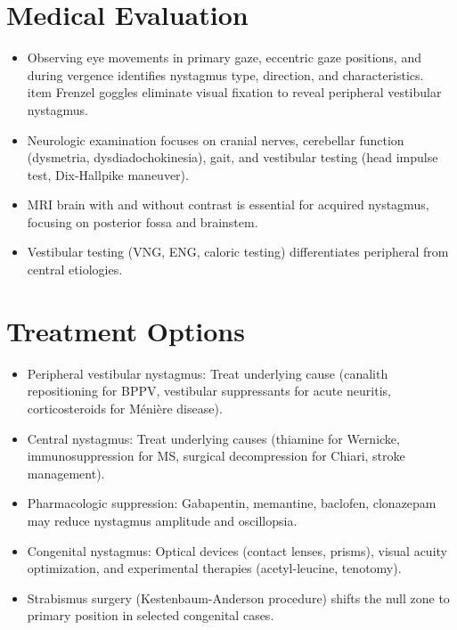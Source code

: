 \section*{Medical Evaluation}
\begin{itemize}
  \item Observing eye movements in primary gaze, eccentric gaze positions, and during vergence identifies nystagmus type, direction, and characteristics.
  \\item Frenzel goggles eliminate visual fixation to reveal peripheral vestibular nystagmus.
  \item Neurologic examination focuses on cranial nerves, cerebellar function (dysmetria, dysdiadochokinesia), gait, and vestibular testing (head impulse test, Dix-Hallpike maneuver).
  \item MRI brain with and without contrast is essential for acquired nystagmus, focusing on posterior fossa and brainstem.
  \item Vestibular testing (VNG, ENG, caloric testing) differentiates peripheral from central etiologies.
\end{itemize}

\section*{Treatment Options}
\begin{itemize}
  \item Peripheral vestibular nystagmus: Treat underlying cause (canalith repositioning for BPPV, vestibular suppressants for acute neuritis, corticosteroids for M\'eni\`ere disease).
  \item Central nystagmus: Treat underlying causes (thiamine for Wernicke, immunosuppression for MS, surgical decompression for Chiari, stroke management).
  \item Pharmacologic suppression: Gabapentin, memantine, baclofen, clonazepam may reduce nystagmus amplitude and oscillopsia.
  \item Congenital nystagmus: Optical devices (contact lenses, prisms), visual acuity optimization, and experimental therapies (acetyl-leucine, tenotomy).
  \item Strabismus surgery (Kestenbaum-Anderson procedure) shifts the null zone to primary position in selected congenital cases.
\end{itemize}

